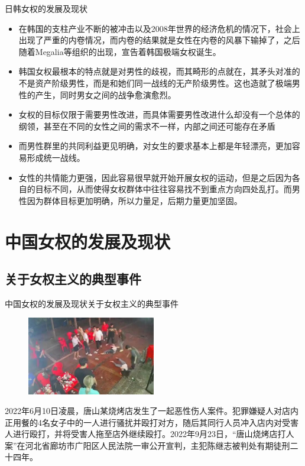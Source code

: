 \documentclass{beamer}
\begin{document}
	\begin{frame}{日韩女权的发展及现状}
		\begin{itemize}
			\item 在韩国的支柱产业不断的被冲击以及2008年世界的经济危机的情况下，社会上出现了严重的内卷情况，而内卷的结果就是女性在内卷的风暴下输掉了，之后随着Megalia等组织的出现，宣告着韩国极端女权诞生。
			\item 韩国女权最根本的特点就是对男性的歧视，而其畸形的点就在，其矛头对准的不是资产阶级男性，而是和她们同一战线的无产阶级男性。这也造就了极端男性的产生，同时男女之间的战争愈演愈烈。
			\item 女权的目标仅限于需要男性改进，而具体需要男性改进什么却没有一个总体的纲领，甚至在不同的女性之间的需求不一样，内部之间还可能存在矛盾
			\item 而男性群里的共同利益更见明确，对女生的要求基本上都是年轻漂亮，更加容易形成统一战线。
			\item 女性的共情能力更强，因此容易很早就开始开展女权的运动，但是之后因为各自的目标不同，从而使得女权群体中往往容易找不到重点方向四处乱打。而男性因为群体目标更加明确，所以力量足，后期力量更加坚固。
		\end{itemize}
	\end{frame}
	
	\section{中国女权的发展及现状}
	\subsection*{关于女权主义的典型事件}
	\begin{frame}{中国女权的发展及现状}{关于女权主义的典型事件}
		\begin{figure}
			\centering
			\includegraphics[width=0.5\textwidth]{img/图片2.jpg}
		\end{figure}

		2022年6月10日凌晨，唐山某烧烤店发生了一起恶性伤人案件。犯罪嫌疑人对店内正用餐的4名女子中的一人进行骚扰并殴打对方，随后其同行人员冲入店内对受害人进行殴打，并将受害人拖至店外继续殴打。2022年9月23日，“唐山烧烤店打人案”在河北省廊坊市广阳区人民法院一审公开宣判，主犯陈继志被判处有期徒刑二十四年。

	\end{frame}
\end{document}
